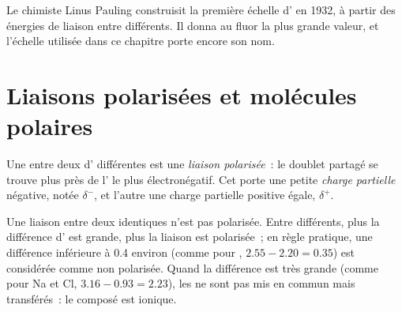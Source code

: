\begin{history}
Le chimiste Linus Pauling construisit la première échelle
d' en 1932, à partir des énergies de liaison entre
 différents. Il donna au fluor la plus grande valeur, et l'échelle
utilisée dans ce chapitre porte encore son nom.
\end{history}

\section{Liaisons polarisées et molécules polaires}

\begin{definition}\label{def:g11:polarity-and-cohesion:polar-bond}
Une  entre deux  d' différentes
est une \emph{liaison polarisée}~: le doublet
partagé se trouve plus près de l' le plus électronégatif. Cet 
porte une petite \emph{charge partielle}
négative, notée $\delta^-$, et l'autre  une charge partielle
positive égale, $\delta^+$.
\end{definition}

\begin{proposition}\label{prop:g11:polarity-and-cohesion:polar-bond}
Une liaison entre deux  identiques n'est pas polarisée. Entre
 différents, plus la différence d' est grande,
plus la liaison est polarisée~; en règle pratique, une différence
inférieure à 0.4 environ (comme pour , $2.55 - 2.20 = 0.35$) est
considérée comme non polarisée. Quand la différence est très grande
(comme pour Na et Cl, $3.16 - 0.93 = 2.23$), les  ne sont pas
mis en commun mais transférés~: le composé est ionique.
\end{proposition}

